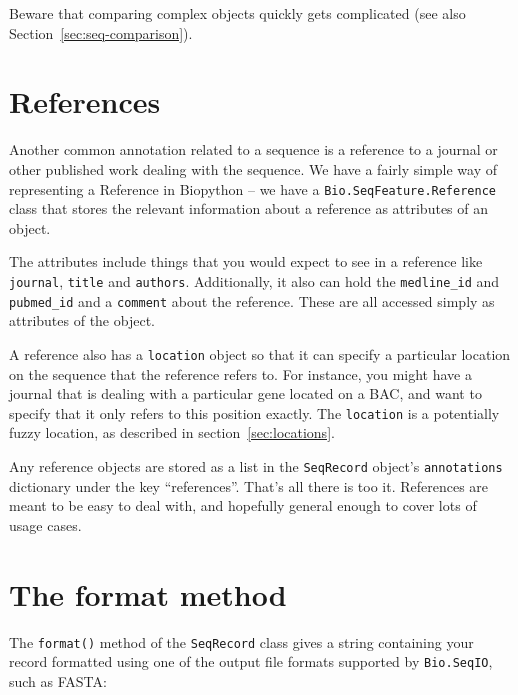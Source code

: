 Beware that comparing complex objects quickly gets complicated (see also
Section~\ref{sec:seq-comparison}).

\section{References}

Another common annotation related to a sequence is a reference to a journal or other published work dealing with the sequence. We have a fairly simple way of representing a Reference in Biopython -- we have a \verb|Bio.SeqFeature.Reference| class that stores the relevant information about a reference as attributes of an object.

The attributes include things that you would expect to see in a reference like \verb|journal|, \verb|title| and \verb|authors|. Additionally, it also can hold the \verb|medline_id| and \verb|pubmed_id| and a \verb|comment| about the reference. These are all accessed simply as attributes of the object.

A reference also has a \verb|location| object so that it can specify a particular location on the sequence that the reference refers to. For instance, you might have a journal that is dealing with a particular gene located on a BAC, and want to specify that it only refers to this position exactly. The \verb|location| is a potentially fuzzy location, as described in section~\ref{sec:locations}.

Any reference objects are stored as a list in the \verb|SeqRecord| object's \verb|annotations| dictionary under the key ``references''.
That's all there is too it. References are meant to be easy to deal with, and hopefully general enough to cover lots of usage cases.

\section{The format method}
\label{sec:SeqRecord-format}

The \verb|format()| method of the \verb|SeqRecord| class gives a string
containing your record formatted using one of the output file formats
supported by \verb|Bio.SeqIO|, such as FASTA:

